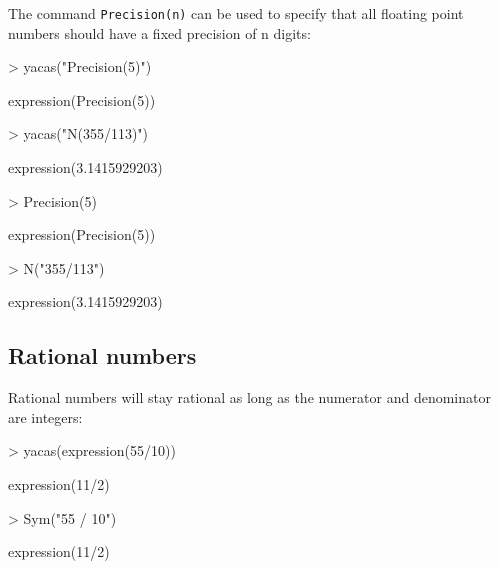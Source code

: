\documentclass[]{article}
\newcommand{\code}[1]{{\tt #1}}
\begin{document}
The command \code{Precision(n)}
can be used to specify that all floating point numbers should have a
fixed precision of n digits:
\begin{Schunk}
\begin{Sinput}
> yacas("Precision(5)")
\end{Sinput}
\begin{Soutput}
expression(Precision(5))
\end{Soutput}
\begin{Sinput}
> yacas("N(355/113)")
\end{Sinput}
\begin{Soutput}
expression(3.1415929203)
\end{Soutput}
\end{Schunk}

\begin{Schunk}
\begin{Sinput}
> Precision(5)
\end{Sinput}
\begin{Soutput}
expression(Precision(5))
\end{Soutput}
\begin{Sinput}
> N("355/113")
\end{Sinput}
\begin{Soutput}
expression(3.1415929203)
\end{Soutput}
\end{Schunk}


\subsection{Rational numbers}

Rational numbers will stay rational as long as the numerator and
denominator are integers:
\begin{Schunk}
\begin{Sinput}
> yacas(expression(55/10))
\end{Sinput}
\begin{Soutput}
expression(11/2)
\end{Soutput}
\end{Schunk}

\begin{Schunk}
\begin{Sinput}
> Sym("55 / 10")
\end{Sinput}
\begin{Soutput}
expression(11/2)
\end{Soutput}
\end{Schunk}
\end{document}
